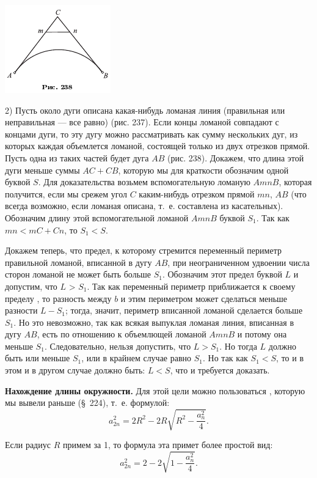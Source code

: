 \documentclass[oneside]{book}
\begin{document}
\includegraphics{pics/ris-238}


2) Пусть около дуги описана какая-нибудь ломаная линия (правильная или неправильная — все равно) (рис. 237).
Если концы ломаной совпадают с концами дуги, то эту дугу можно рассматривать как сумму нескольких дуг, из которых каждая объемлется ломаной, состоящей только из двух отрезков прямой.
Пусть одна из таких частей будет дуга $AB$ (рис. 238).
Докажем, что длина этой дуги меньше суммы $AC+CB$, которую мы для краткости обозначим одной буквой $S$.
Для доказательства возьмем вспомогательную ломаную $AmnB$, которая получится, если мы срежем угол $C$ каким-нибудь отрезком прямой $mn$,  $AB$ (что всегда возможно, если ломаная описана, т.~е. составлена из касательных).
Обозначим длину этой вспомогательной ломаной $AmnB$ буквой $S_1$.
Так как $mn<mC+Cn$, то $S_1<S$.

Докажем теперь, что предел, к которому стремится переменный периметр правильной ломаной, вписанной в дугу $AB$, при неограниченном удвоении числа сторон ломаной не может быть больше $S_1$.
Обозначим этот предел буквой $L$ и допустим, что $L$ > $S_1$.
Так как переменный периметр приближается к своему пределу , то разность между $b$ и этим периметром может сделаться меньше разности $L-S_1$; тогда, значит, периметр вписанной ломаной сделается больше $S_1$.
Но это невозможно, так как всякая выпуклая ломаная линия, вписанная в дугу $AB$, есть  по отношению к объемлющей ломаной $AmnB$ и потому она меньше $S_1$.
Следовательно, нельзя допустить, что $L>S_1$.
Но тогда $L$ должно быть или меньше $S_1$, или в крайнем случае равно $S_1$.
Но так как $S_1<S$, то и в этом и в другом случае должно быть:
$L<S$, что и требуется доказать.

\textbf{Нахождение длины окружности.}
Для этой цели можно пользоваться , которую мы вывели раньше (§~224), т.~е.
формулой:
\[a_{2n}^2=2R^2-2R\sqrt{R^2-\frac{a_n^2}4}.\]

Если радиус $R$ примем за 1, то формула эта примет более простой вид:
\[a_{2n}^2=2-2\sqrt{1-\frac{a_n^2}4}.\]
\end{document}
